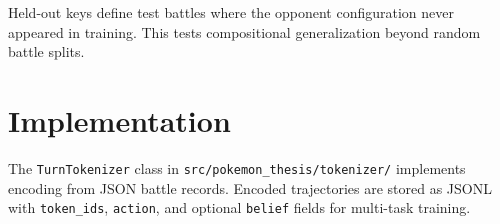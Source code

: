 Held-out keys define test battles where the opponent configuration never
appeared in training. This tests compositional generalization beyond random
battle splits.

\section{Implementation}

The \texttt{TurnTokenizer} class in \texttt{src/pokemon\_thesis/tokenizer/}
implements encoding from JSON battle records. Encoded trajectories are stored as
JSONL with \texttt{token\_ids}, \texttt{action}, and optional \texttt{belief}
fields for multi-task training.
